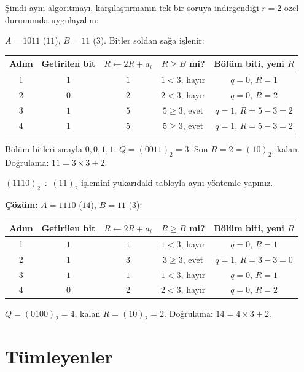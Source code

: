 Şimdi aynı algoritmayı, karşılaştırmanın tek bir soruya indirgendiği $r=2$ özel durumunda
uygulayalım:

\begin{ornek}[$(1011)_2 \div (11)_2$]
$A=1011$ ($11$), $B=11$ ($3$). Bitler soldan sağa işlenir:
\begin{center}
\begin{tabular}{ccccc}
\toprule
Adım & Getirilen bit & $R\leftarrow 2R+a_i$ & $R\ge B$ mi? & Bölüm biti, yeni $R$ \\
\midrule
1 & $1$ & $1$ & $1<3$, hayır & $q{=}0$, $R{=}1$ \\
2 & $0$ & $2$ & $2<3$, hayır & $q{=}0$, $R{=}2$ \\
3 & $1$ & $5$ & $5\ge3$, evet & $q{=}1$, $R{=}5-3=2$ \\
4 & $1$ & $5$ & $5\ge3$, evet & $q{=}1$, $R{=}5-3=2$ \\
\bottomrule
\end{tabular}
\end{center}
Bölüm bitleri sırayla $0,0,1,1$: $Q=(0011)_2=3$. Son $R=2=(10)_2$, kalan. Doğrulama:
$11 = 3\times3+2$. \checkmark
\end{ornek}

\begin{alistirma}[\orta]
$(1110)_2 \div (11)_2$ işlemini yukarıdaki tabloyla aynı yöntemle yapınız.
\end{alistirma}

\noindent\textbf{Çözüm:} $A=1110$ ($14$), $B=11$ ($3$):
\begin{center}
\begin{tabular}{ccccc}
\toprule
Adım & Getirilen bit & $R\leftarrow 2R+a_i$ & $R\ge B$ mi? & Bölüm biti, yeni $R$ \\
\midrule
1 & $1$ & $1$ & $1<3$, hayır & $q{=}0$, $R{=}1$ \\
2 & $1$ & $3$ & $3\ge3$, evet & $q{=}1$, $R{=}3-3=0$ \\
3 & $1$ & $1$ & $1<3$, hayır & $q{=}0$, $R{=}1$ \\
4 & $0$ & $2$ & $2<3$, hayır & $q{=}0$, $R{=}2$ \\
\bottomrule
\end{tabular}
\end{center}
$Q=(0100)_2=4$, kalan $R=(10)_2=2$. Doğrulama: $14=4\times3+2$. \checkmark

\section{Tümleyenler}
\label{sec:tumleyenler}

